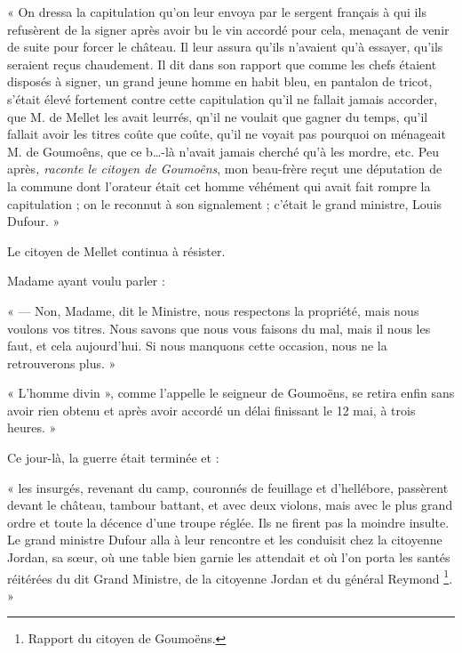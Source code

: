 \documentclass[french,twoside]{book} %
\newenvironment{quoteblock}%
  {\begin{quoting}}
  {\end{quoting}}
\newenvironment{quotebar}{%
    \def\FrameCommand{{\color{rubric!10!}\vrule width 0.5em} \hspace{0.9em}}%
    \def\OuterFrameSep{\itemsep} %
    \MakeFramed {\advance\hsize-\width \FrameRestore}
  }%
  {%
    \endMakeFramed
  }
\renewenvironment{quoteblock}%
  {%
    \savenotes
    \setstretch{0.9}
    \begin{quotebar}
  }
  {%
    \end{quotebar}
    \spewnotes
  }
\begin{document}
\begin{quoteblock}
 \noindent « On dressa la capitulation qu’on leur envoya par le sergent français à qui ils refusèrent de la signer après avoir bu le vin accordé pour cela, menaçant de venir de suite pour forcer le château. Il leur assura qu’ils n’avaient qu’à essayer, qu’ils seraient reçus chaudement. Il dit dans son rapport que comme les chefs étaient disposés à signer, un grand jeune homme en habit bleu, en pantalon de tricot, s’était élevé fortement contre cette capitulation qu’il ne fallait jamais accorder, que M. de Mellet les avait leurrés, qn’il ne voulait que gagner du temps, qu’il fallait avoir les titres coûte que coûte, qu’il ne voyait pas pourquoi on ménageait M. de Goumoêns, que ce b…-là n’avait jamais cherché qu’à les mordre, etc. Peu après\emph{, raconte le citoyen de Goumoêns}, mon beau-frère reçut une députation de la commune dont l’orateur était cet homme véhément qui avait fait rompre la capitulation ; on le reconnut à son signalement ; c’était le grand ministre, Louis Dufour. »\par
 Le citoyen de Mellet continua à résister.\par
  Madame ayant voulu parler :\par
 « — Non, Madame, dit le Ministre, nous respectons la propriété, mais nous voulons vos titres. Nous savons que nous vous faisons du mal, mais il nous les faut, et cela aujourd’hui. Si nous manquons cette occasion, nous ne la retrouverons plus. »\par
 « L’homme divin », comme l’appelle le seigneur de Goumoëns, se retira enfin sans avoir rien obtenu et après avoir accordé un délai finissant le 12 mai, à trois heures. »
 \end{quoteblock}

\noindent Ce jour-là, la guerre était terminée et :\par

\begin{quoteblock}
\noindent « les insurgés, revenant du camp, couronnés de feuillage et d’hellébore, passèrent devant le château, tambour battant, et avec deux violons, mais avec le plus grand ordre et toute la décence d’une troupe réglée. Ils ne firent pas la moindre insulte. Le grand ministre Dufour alla à leur rencontre et les conduisit chez la citoyenne Jordan, sa sœur, où une table bien garnie les attendait et où l’on porta les santés réitérées du dit Grand Ministre, de la citoyenne Jordan et du général Reymond \footnote{Rapport du citoyen de Goumoëns.}. »\end{quoteblock}
\end{document}
